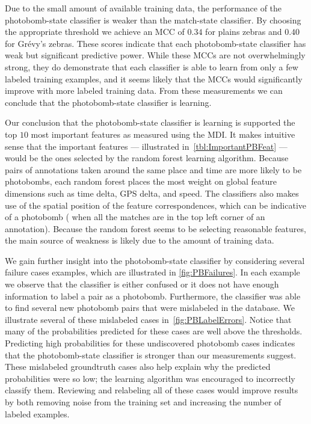         Due to the small amount of available training data, the performance of the photobomb-state classifier is
          weaker than the match-state classifier.
        By choosing the appropriate threshold we achieve an MCC of $0.34$ for plains zebras and $0.40$ for
          Grévy's zebras.
        These scores indicate that each photobomb-state classifier has weak but significant predictive power.
        While these MCCs are not overwhelmingly strong, they do demonstrate that each classifier is able to learn
          from only a few labeled training examples, and it seems likely that the MCCs would significantly improve
          with more labeled training data.
        From these measurements we can conclude that the photobomb-state classifier is learning.

        \FloatBarrier{}

        Our conclusion that the photobomb-state classifier is learning is supported the top $10$ most important
          features as measured using the MDI.
        It makes intuitive sense that the important features --- illustrated in~\cref{tbl:ImportantPBFeat} ---
          would be the ones selected by the random forest learning algorithm.
        Because pairs of annotations taken around the same place and time are more likely to be photobombs, each
          random forest places the most weight on global feature dimensions such as time delta, GPS delta, and
          speed.
        The classifiers also makes use of the spatial position of the feature correspondences, which can be
          indicative of a photobomb (\eg{} when all the matches are in the top left corner of an annotation).
        Because the random forest seems to be selecting reasonable features, the main source of weakness is
          likely due to the amount of training data.

        \ImportantPBFeat{}

        We gain further insight into the photobomb-state classifier by considering several failure cases
          examples, which are illustrated in \cref{fig:PBFailures}.
        In each example we observe that the classifier is either confused or it does not have enough information
          to label a pair as a photobomb.
        Furthermore, the classifier was able to find several new photobomb pairs that were mislabeled in the
          database.
        We illustrate several of these mislabeled cases in~\cref{fig:PBLabelErrors}.
        Notice that many of the probabilities predicted for these cases are well above the thresholds.
        Predicting high probabilities for these undiscovered photobomb cases indicates that the photobomb-state
          classifier is stronger than our measurements suggest.
        These mislabeled groundtruth cases also help explain why the predicted probabilities were so low; the
          learning algorithm was encouraged to incorrectly classify them.
        Reviewing and relabeling all of these cases would improve results by both removing noise from the
          training set and increasing the number of labeled examples.

